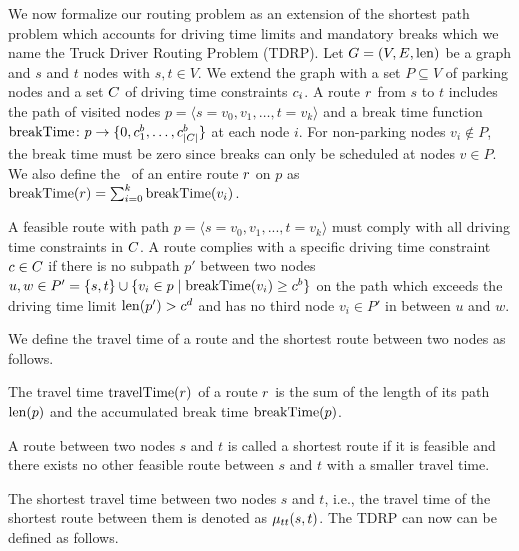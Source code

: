 We now formalize our routing problem as an extension of the shortest path problem which accounts for driving time limits and mandatory breaks which we name the Truck Driver Routing Problem (TDRP). Let $G=(V,E,\operatorname{len})$ be a graph and $s$ and $t$ nodes with $s,t \in V$. We extend the graph with a set $P \subseteq V$ of parking nodes and a set $C$ of driving time constraints $c_i$. A route $r$ from $s$ to $t$ includes the path of visited nodes $p = \langle s=v_0,v_1,\dots,t=v_k \rangle$ and a break time function $\operatorname{breakTime}\colon p \rightarrow \{0,c_1^b,\dots,c_{|C|}^b\}$ at each node $i$. For non-parking nodes $v_i \notin P$, the break time must be zero since breaks can only be scheduled at nodes $v \in P$. We also define the \breakTime\ of an entire route $r$ on $p$ as $\operatorname{breakTime}(r) = \sum_{i=0}^{k}{\operatorname{breakTime}(v_i)}$.

\begin{definition}
	A feasible route with path $p = \langle s=v_0,v_1,...,t=v_k \rangle$ must comply with all driving time constraints in $C$. A route complies with a specific driving time constraint $c \in C$ if there is no subpath $p'$ between two nodes $u,w \in P' = \{s,t\} \cup \{v_i \in p \mid \operatorname{breakTime}(v_i) \ge c^b\}$ on the path which exceeds the driving time limit $\operatorname{len}(p') > c^d$ and has no third node $v_i \in P'$ in between $u$ and $w$.
\end{definition}

We define the travel time of a route and the shortest route between two nodes as follows.

\begin{definition}
	The travel time $\operatorname{travelTime}(r)$ of a route $r$ is the sum of the length of its path $\operatorname{len}(p)$ and the accumulated break time $\operatorname{breakTime}(p)$.
\end{definition}

\begin{definition}
	A route between two nodes $s$ and $t$ is called a shortest route if it is feasible and there exists no other feasible route between $s$ and $t$ with a smaller travel time.
\end{definition}

The shortest travel time between two nodes $s$ and $t$, i.e., the travel time of the shortest route between them is denoted as $\mu_{tt}(s,t)$. The TDRP can now can be defined as follows.

